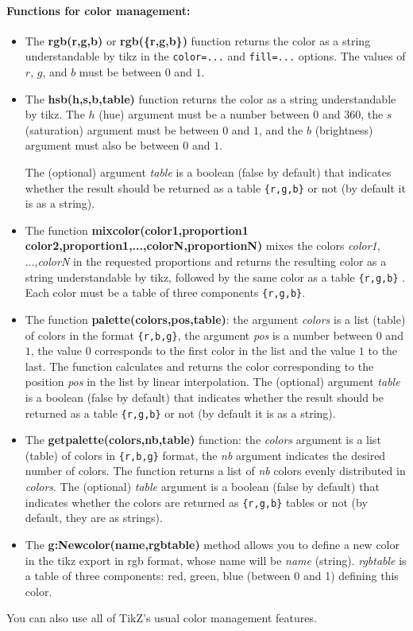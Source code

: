 \paragraph{Functions for color management:}
\begin{itemize}
    \item The \textbf{rgb(r,g,b)} or \textbf{rgb(\{r,g,b\})} function returns the color as a string understandable by tikz in the \verb|color=...| and \verb|fill=...| options. The values ​​of $r$, $g$, and $b$ must be between $0$ and $1$.

    \item The \textbf{hsb(h,s,b,table)} function returns the color as a string understandable by tikz. The $h$ (hue) argument must be a number between $0$ and $360$, the $s$ (saturation) argument must be between $0$ and $1$, and the $b$ (brightness) argument must also be between $0$ and $1$.

The (optional) argument \emph{table} is a boolean (false by default) that indicates whether the result should be returned as a table \verb|{r,g,b}| or not (by default it is as a string).

    \item The function \textbf{mixcolor(color1,proportion1 color2,proportion1,...,colorN,proportionN)} mixes the colors \emph{color1}, ...,\emph{colorN} in the requested proportions and returns the resulting color as a string understandable by tikz, followed by the same color as a table \verb|{r,g,b}| . Each color must be a table of three components \verb|{r,g,b}|.

    \item The function \textbf{palette(colors,pos,table)}: the argument \emph{colors} is a list (table) of colors in the format \verb|{r,b,g}|, the argument \emph{pos} is a number between $0$ and $1$, the value $0$ corresponds to the first color in the list and the value $1$ to the last. The function calculates and returns the color corresponding to the position \emph{pos} in the list by linear interpolation. The (optional) argument \emph{table} is a boolean (false by default) that indicates whether the result should be returned as a table \verb|{r,g,b}| or not (by default it is as a string).

    \item The \textbf{getpalette(colors,nb,table)} function: the \emph{colors} argument is a list (table) of colors in \verb|{r,b,g}| format, the \emph{nb} argument indicates the desired number of colors. The function returns a list of \emph{nb} colors evenly distributed in \emph{colors}. The (optional) \emph{table} argument is a boolean (false by default) that indicates whether the colors are returned as \verb|{r,g,b}| tables or not (by default, they are as strings).

    \item The \textbf{g:Newcolor(name,rgbtable)} method allows you to define a new color in the tikz export in rgb format, whose name will be \emph{name} (string). \emph{rgbtable} is a table of three components: red, green, blue (between 0 and 1) defining this color.

\end{itemize}
You can also use all of TikZ's usual color management features.

